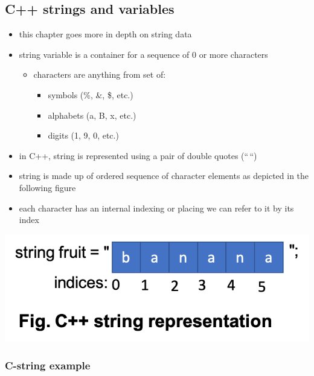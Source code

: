 \documentclass[11pt]{article}
\providecommand{\tightlist}{%
      \setlength{\itemsep}{0pt}\setlength{\parskip}{0pt}}
\begin{document}
    \hypertarget{c-strings-and-variables}{%
\subsection{C++ strings and variables}\label{c-strings-and-variables}}

\begin{itemize}
\tightlist
\item
  this chapter goes more in depth on string data
\item
  string variable is a container for a sequence of 0 or more characters

  \begin{itemize}
  \tightlist
  \item
    characters are anything from set of:

    \begin{itemize}
    \tightlist
    \item
      symbols (\%, \&, \$, etc.)
    \item
      alphabets (a, B, x, etc.)
    \item
      digits (1, 9, 0, etc.)
    \end{itemize}
  \end{itemize}
\item
  in C++, string is represented using a pair of double quotes (``\,``)\\
\item
  string is made up of ordered sequence of character elements as
  depicted in the following figure
\item
  each character has an internal indexing or placing we can refer to it
  by its index
\end{itemize}

\includegraphics{resources/string_rep.png}

\hypertarget{c-string-example}{%
\subsubsection{C-string example}\label{c-string-example}}
\end{document}
